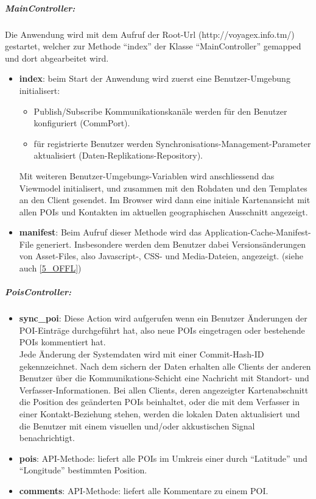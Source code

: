 \subparagraph{MainController:}
Die Anwendung wird mit dem Aufruf der Root-Url (http://voyagex.info.tm/) gestartet, welcher
zur Methode "`index"' der Klasse "`MainController"' gemapped und dort abgearbeitet wird. 
\begin{itemize}[leftmargin=*,noitemsep,topsep=1ex,parsep=0pt,partopsep=0pt]
\item \textbf{index}: beim Start der Anwendung wird zuerst eine Benutzer-Umgebung initialisert:
  \begin{itemize}[leftmargin=*,noitemsep,topsep=1ex,parsep=0pt,partopsep=0pt]
    \item Publish/Subscribe Kommunikationskanäle werden für den Benutzer konfiguriert (CommPort).
    \item für registrierte Benutzer werden Synchronisations-Management-Parameter aktualisiert (Daten-Replikations-Repository).
  \end{itemize}
Mit weiteren Benutzer-Umgebungs-Variablen wird anschliessend das Viewmodel initialisert, und zusammen mit den Rohdaten und den Templates an den Client gesendet. Im Browser wird dann eine  initiale Kartenansicht mit allen POIs und Kontakten im aktuellen geographischen Ausschnitt angezeigt.
\item \textbf{manifest}: Beim Aufruf dieser Methode wird das Application-Cache-Manifest-File generiert. Insbesondere werden dem Benutzer dabei Versionsänderungen von Asset-Files, also Javascript-, CSS- und Media-Dateien, angezeigt. (siehe auch \ref{5_OFFL})
\end{itemize}
\subparagraph{PoisController:}
\begin{itemize}[leftmargin=*,noitemsep,topsep=1ex,parsep=0pt,partopsep=0pt]
\item \textbf{sync\_poi}: Diese Action wird aufgerufen wenn ein Benutzer Änderungen der POI-Einträge durchgeführt hat, also neue POIs eingetragen oder bestehende POIs kommentiert hat.\\
Jede Änderung der Systemdaten wird mit einer Commit-Hash-ID gekennzeichnet. Nach dem sichern der Daten erhalten alle Clients der anderen Benutzer über die Kommunikations-Schicht eine Nachricht mit Standort- und Verfasser-Informationen. Bei allen Clients, deren angezeigter Kartenabschnitt die Position des geänderten POIs beinhaltet, oder die mit dem Verfasser in einer Kontakt-Beziehung stehen, werden die lokalen Daten aktualisiert und die Benutzer mit einem visuellen und/oder akkustischen Signal benachrichtigt.
\item \textbf{pois}: API-Methode: liefert alle POIs im Umkreis einer durch "`Latitude"' und "`Longitude"' bestimmten Position.
\item \textbf{comments}: API-Methode: liefert alle Kommentare zu einem POI.
\end{itemize}
